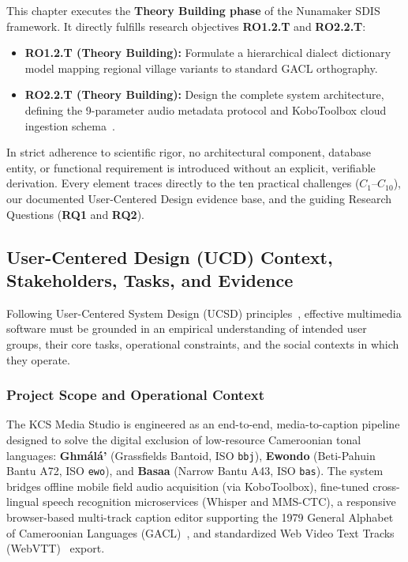 \documentclass[a4paper,11pt]{article}
\begin{document}
This chapter executes the \textbf{Theory Building phase} of the Nunamaker SDIS framework. It directly fulfills research objectives \textbf{RO1.2.T} and \textbf{RO2.2.T}:
\begin{itemize}
    \item \textbf{RO1.2.T (Theory Building):} Formulate a hierarchical dialect dictionary model mapping regional village variants to standard GACL orthography.
    \item \textbf{RO2.2.T (Theory Building):} Design the complete system architecture, defining the 9-parameter audio metadata protocol and KoboToolbox cloud ingestion schema~\cite{kobotoolbox2024}.
\end{itemize}

In strict adherence to scientific rigor, no architectural component, database entity, or functional requirement is introduced without an explicit, verifiable derivation. Every element traces directly to the ten practical challenges ($C_1$--$C_{10}$), our documented User-Centered Design evidence base, and the guiding Research Questions (\textbf{RQ1} and \textbf{RQ2}).

\subsection{User-Centered Design (UCD) Context, Stakeholders, Tasks, and Evidence}
\label{sec:chap3_ucd}

Following User-Centered System Design (UCSD) principles~\cite{norman1986user}, effective multimedia software must be grounded in an empirical understanding of intended user groups, their core tasks, operational constraints, and the social contexts in which they operate.

\subsubsection{Project Scope and Operational Context}
\label{sec:chap3_ucd_scope}
The KCS Media Studio is engineered as an end-to-end, media-to-caption pipeline designed to solve the digital exclusion of low-resource Cameroonian tonal languages: \textbf{Gh\textopeno m\'al\'a'} (Grassfields Bantoid, ISO \texttt{bbj}), \textbf{Ewondo} (Beti-Pahuin Bantu A72, ISO \texttt{ewo}), and \textbf{Basaa} (Narrow Bantu A43, ISO \texttt{bas}). The system bridges offline mobile field audio acquisition (via KoboToolbox), fine-tuned cross-lingual speech recognition microservices (Whisper and MMS-CTC), a responsive browser-based multi-track caption editor supporting the 1979 General Alphabet of Cameroonian Languages (GACL)~\cite{tadadjeu1979alphabet}, and standardized Web Video Text Tracks (WebVTT)~\cite{w3c2019webvtt} export.
\end{document}
